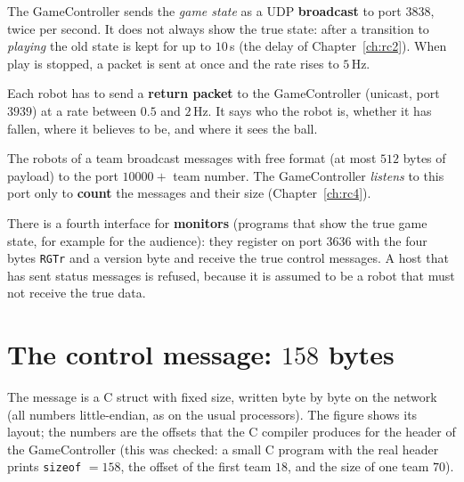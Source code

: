 \begin{description}[leftmargin=0.6cm]
 \item[Control message] The GameController sends the \emph{game state} as a UDP \textbf{broadcast} to port $3838$, twice per second. It does not always show the true state: after a transition to \emph{playing} the old state is kept for up to $10$\,s (the delay of Chapter~\ref{ch:rc2}). When play is stopped, a packet is sent at once and the rate rises to $5$\,Hz.
 \item[Status message] Each robot has to send a \textbf{return packet} to the GameController (unicast, port $3939$) at a rate between $0.5$ and $2$\,Hz. It says who the robot is, whether it has fallen, where it believes to be, and where it sees the ball.
 \item[Team messages] The robots of a team broadcast messages with free format (at most $512$ bytes of payload) to the port $10000+$ team number. The GameController \emph{listens} to this port only to \textbf{count} the messages and their size (Chapter~\ref{ch:rc4}).
\end{description}
There is a fourth interface for \textbf{monitors} (programs that show the true game state, for example for the audience): they register on port $3636$ with the four bytes \texttt{RGTr} and a version byte and receive the true control messages. A host that has sent status messages is refused, because it is assumed to be a robot that must not receive the true data.

\section*{The control message: $158$ bytes}
The message is a C struct with fixed size, written byte by byte on the network (all numbers little-endian, as on the usual processors). The figure shows its layout; the numbers are the offsets that the C compiler produces for the header of the GameController (this was checked: a small C program with the real header prints \verb!sizeof! $=158$, the offset of the first team $18$, and the size of one team $70$).

